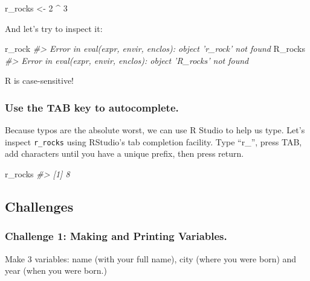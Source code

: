 \documentclass[]{book}
\newenvironment{Shaded}{\begin{snugshade}}{\end{snugshade}}
\newcommand{\DecValTok}[1]{\textcolor[rgb]{0.00,0.00,0.81}{#1}}
\newcommand{\StringTok}[1]{\textcolor[rgb]{0.31,0.60,0.02}{#1}}
\newcommand{\CommentTok}[1]{\textcolor[rgb]{0.56,0.35,0.01}{\textit{#1}}}
\newcommand{\OperatorTok}[1]{\textcolor[rgb]{0.81,0.36,0.00}{\textbf{#1}}}
\newcommand{\NormalTok}[1]{#1}
\begin{document}
\begin{Shaded}
\begin{Highlighting}[]
\NormalTok{r_rocks <-}\StringTok{ }\DecValTok{2} \OperatorTok{^}\StringTok{ }\DecValTok{3}
\end{Highlighting}
\end{Shaded}

And let's try to inspect it:

\begin{Shaded}
\begin{Highlighting}[]
\NormalTok{r_rock}
\CommentTok{#> Error in eval(expr, envir, enclos): object 'r_rock' not found}
\NormalTok{R_rocks}
\CommentTok{#> Error in eval(expr, envir, enclos): object 'R_rocks' not found}
\end{Highlighting}
\end{Shaded}

R is case-sensitive!

\subsubsection*{Use the TAB key to
autocomplete.}\label{use-the-tab-key-to-autocomplete.}

Because typos are the absolute worst, we can use R Studio to help us
type. Let's inspect \texttt{r\_rocks} using RStudio's tab completion
facility. Type ``r\_'', press TAB, add characters until you have a
unique prefix, then press return.

\begin{Shaded}
\begin{Highlighting}[]
\NormalTok{r_rocks}
\CommentTok{#> [1] 8}
\end{Highlighting}
\end{Shaded}

\subsection{Challenges}\label{challenges-2}

\subsubsection*{Challenge 1: Making and Printing
Variables.}\label{challenge-1-making-and-printing-variables.}

Make 3 variables: name (with your full name), city (where you were born)
and year (when you were born.)
\end{document}
